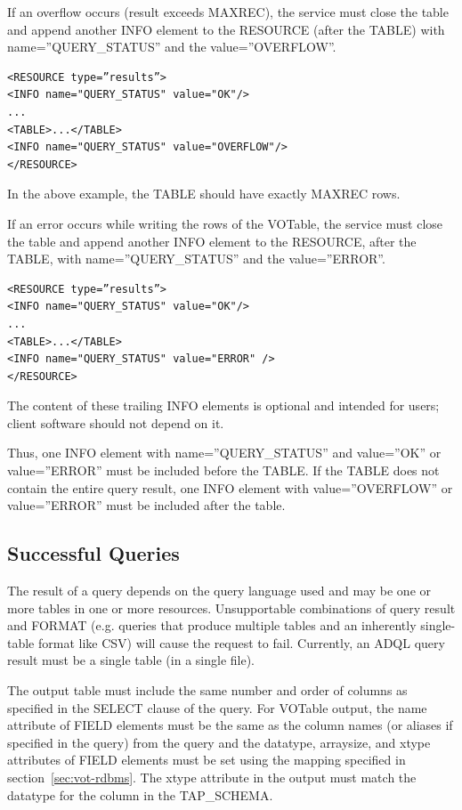 \documentclass[11pt,letter]{ivoa}
\begin{document}
If an overflow occurs (result exceeds MAXREC), the service must close the table 
and append another INFO element to the RESOURCE (after the TABLE) with 
name=”QUERY\_STATUS” and the value=”OVERFLOW”.
\begin{verbatim}
<RESOURCE type=”results”>
<INFO name="QUERY_STATUS" value="OK"/>
...
<TABLE>...</TABLE>
<INFO name="QUERY_STATUS" value="OVERFLOW"/>
</RESOURCE>
\end{verbatim}

In the above example, the TABLE should have exactly MAXREC rows.

If an error occurs while writing the rows of the VOTable, the service must 
close the table and append another INFO element to the RESOURCE, after the 
TABLE, with name=”QUERY\_STATUS” and the value=”ERROR”.
\begin{verbatim}
<RESOURCE type=”results”>
<INFO name="QUERY_STATUS" value="OK"/>
...
<TABLE>...</TABLE>
<INFO name="QUERY_STATUS" value="ERROR" />
</RESOURCE>
\end{verbatim}
The content of these trailing INFO elements is optional and intended for users; 
client software should not depend on it.

Thus, one INFO element with name=”QUERY\_STATUS” and value=”OK” or 
value=”ERROR” must be included before the TABLE. If the TABLE does not contain 
the entire query result, one INFO element with value=”OVERFLOW” or 
value=”ERROR” must be included after the table. 

\subsection{Successful Queries}
\label{sec:query-ok}

The result of a query depends on the query language used and may be one or more 
tables in one or more resources. Unsupportable combinations of query result and 
FORMAT (e.g. queries that produce multiple tables and an inherently 
single-table format like CSV) will cause the request to fail. Currently, an ADQL 
query result must be a single table (in a single file).

The output table must include the same number and order of columns as specified 
in the SELECT clause of the query. For VOTable output, the name attribute of 
FIELD elements must be the same as the column names (or aliases if specified in 
the query) from the query and the datatype, arraysize, and xtype attributes of 
FIELD elements must be set using the mapping specified in section~\ref{sec:vot-rdbms}. 
The xtype attribute in the output must match the datatype for the column in the 
TAP\_SCHEMA.
\end{document}
